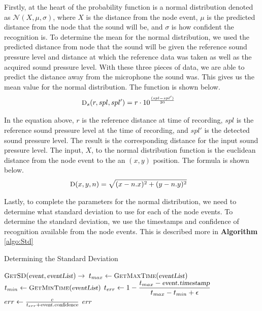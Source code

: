 \documentclass[12pt]{article}
\newcommand{\Normal}[3]{\mathcal{N}(#1, #2, #3)}
\newcommand{\Function}[1]{\ensuremath{{\small \textsc{#1}}}}
\newcommand{\Var}[1]{\ensuremath{{\small{\textsl{#1}}}}}
\begin{document}
Firstly, at the heart of the probability function is a normal distribution
denoted as $\Normal{X}{\mu}{\sigma}$, where $X$ is the distance from the node
event, $\mu$ is the predicted distance from the node that the sound will be,
and $\sigma$ is how confident the recognition is. To determine the mean for the
normal distribution, we used the predicted distance from node that the sound
will be given the reference sound pressure level and distance at which the
reference data was taken as well as the acquired sound pressure level. With
these three pieces of data, we are able to predict the distance away from the
microphone the sound was. This gives us the mean value for the normal
distribution. The function is shown below.  \begin{align*}
\Function{D}_{s}(r, spl, spl') &= r \cdot 10 ^ {\frac{(spl - spl')}{20}}
\end{align*}

In the equation above, $r$ is the reference distance at time of recording,
$spl$ is the reference sound pressure level at the time of recording, and
$spl'$ is the detected sound pressure level. The result is the corresponding
distance for the input sound pressure level. The input, $X$, to the normal
distribution function is the euclidean distance from the node event to the an
$(x, y)$ position. The formula is shown below.  \begin{align*}
\Function{D}(x, y, n) &= \sqrt{(x - n.x) ^ 2 + (y - n.y) ^ 2} \end{align*}

Lastly, to complete the parameters for the normal distribution, we need to
determine what standard deviation to use for each of the node events. To
determine the standard deviation, we use the timestamps and confidence of
recognition available from the node events. This is described more in
\textbf{Algorithm} \ref{algo:Std}

\begin{algorithm}[ht] \caption{Determining the Standard Deviation}
\label{algo:Std} \begin{algorithmic}[1] \setcounter{ALC@line}{0}

\vspace*{1mm}

\STATE $\Function{GetSD}(\Var{event}, \Var{eventList}) \rightarrow$
\STATE $t_{max} \leftarrow \Function{GetMaxTime}(\Var{eventList})$
\STATE $t_{min} \leftarrow \Function{GetMinTime}(\Var{eventList})$
\STATE $t_{err} \leftarrow 1 - \mathlarger{\frac{t_{max} - \Var{event}.\Var{timestamp}}{t_{max} - t_{min} + \epsilon}}$
\STATE $err \leftarrow \frac{c}{t_{err} + \Var{event}.\Var{confidence}}$
\RETURN $err$

\end{algorithmic}
\end{algorithm}
\end{document}
